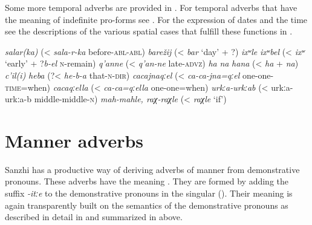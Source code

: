 Some more temporal adverbs are provided in . For temporal adverbs that have the meaning of indefinite pro-forms see . For the expression of dates and the time see the descriptions of the various spatial cases that fulfill these functions in .

\begin{exe}
	\ex	\label{ex:adjectivesWithSalarka}
	\begin{xlist}
		\TabPositions{14em}
		\ex \textit{salar(ka)} 	(< \textit{sala-r-ka} before-\textsc{abl-abl}) 
		\ex	\textit{barežij}  (< \textit{bar} `day' + ?)
		\ex \textit{ixʷle} 		
		\ex \textit{ixʷbel}  (< \textit{ixʷ} `early' + ?\textit{b-el} \textsc{n}-remain)
		\ex	\textit{q'anne}  (< \textit{q'an-ne} late-\textsc{advz})
		\ex	\textit{ha}  
		\ex	\textit{na}  
		\ex \textit{hana} 	(< \textit{ha} + \textit{na})
		\ex \textit{c'il(i)} 		
		\ex \textit{heba}  (?< \textit{he-b-a} that-\textsc{n-dir})
		\ex \textit{cacajnaqːel}  (< \textit{ca-ca-jna=qːel} one-one-\textsc{time}=when)
		\ex \textit{cacaqːella}  (< \textit{ca-ca=qːella} one-one=when)
		\ex \textit{urkːa-urkːab}  (< urkːa-urkːa-b middle-middle-\textsc{n})
		\ex \textit{mah-mahle, raχ-raχle}  (< \textit{raχle} `if')
		\end{xlist}
\end{exe}



\section{Manner adverbs}\label{sec:MannerAdverbs}\largerpage

Sanzhi has a productive way of deriving adverbs of manner from demonstrative pronouns. These adverbs have the meaning . They are formed by adding the suffix \textit{-itːe} to the demonstrative pronouns in the singular (). Their meaning is again transparently built on the semantics of the demonstrative pronouns as described in detail in  and summarized in  above.


